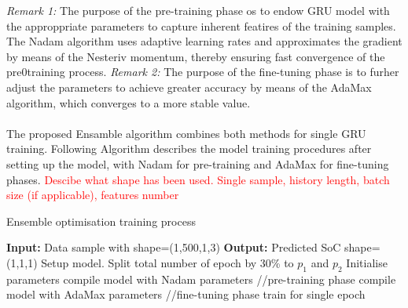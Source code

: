 \textit{Remark 1:} The purpose of the pre-training phase os to endow GRU model with the approppriate parameters to capture inherent featires of the training samples. The Nadam algorithm uses adaptive learning rates and approximates the gradient by means of the Nesteriv momentum, thereby ensuring fast convergence of the pre0training process.
\textit{Remark 2:} The purpose of the fine-tuning phase is to furher adjust the parameters to achieve greater accuracy by means of the AdaMax algorithm, which converges to a more stable value. \\ \\
The proposed Ensamble algorithm combines both methods for single GRU training.
Following Algorithm describes the model training procedures after setting up the model, with Nadam for pre-training and AdaMax for fine-tuning phases.
\textcolor{red}{Descibe what shape has been used. Single sample, history length, batch size (if applicable), features number}
\begin{algorithm}
    \caption{Ensemble optimisation training process}
        \begin{algorithmic}[1]
            \STATE \textbf{Input:} Data sample with shape=(1,500,1,3) 
            \STATE \textbf{Output:} Predicted SoC shape=(1,1,1)
            \STATE Setup model. Split total number of epoch by 30\% to $p_{1}$ and $p_{2}$
            \STATE Initialise parameters
                    \STATE compile model with Nadam parameters //pre-training phase
                \ELSE
                    \STATE compile model with AdaMax parameters //fine-tuning phase
                \ENDIF
                \STATE train for single epoch
            \ENDWHILE
        \end{algorithmic}
    \label{alg:ENS}
\end{algorithm}
